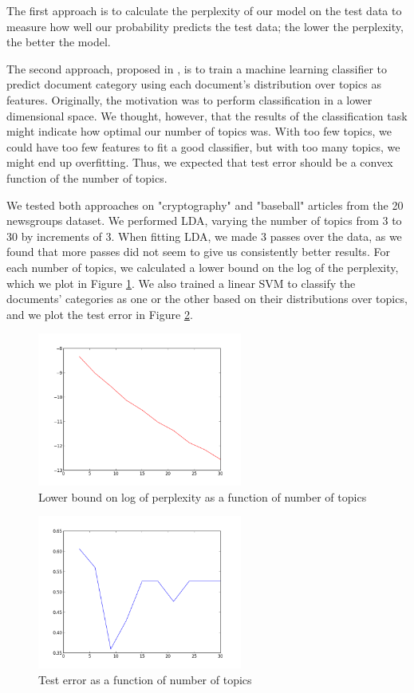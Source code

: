 \documentclass[10pt]{article}
\begin{document}
The first approach is to calculate the perplexity of our model on the test data to measure how well our probability predicts the test data; the lower the perplexity, the better the model.  

The second approach, proposed in \cite{lda}, is to train a machine learning classifier to predict document category using each document's distribution over topics as features.  Originally, the motivation was to perform classification in a lower dimensional space.  We thought, however, that the results of the classification task might indicate how optimal our number of topics was.  With too few topics, we could have too few features to fit a good classifier, but with too many topics, we might end up overfitting.  Thus, we expected that test error should be a convex function of the number of topics.  

We tested both approaches on "cryptography" and "baseball" articles from the 20 newsgroups dataset.  We performed LDA, varying the number of topics from 3 to 30 by increments of 3.  When fitting LDA, we made 3 passes over the data, as we found that more passes did not seem to give us consistently better results.  For each number of topics, we calculated a lower bound on the log of the perplexity, which we plot in Figure \ref{perplexity}.  We also trained a linear SVM to classify the documents' categories as one or the other based on their distributions over topics, and we plot the test error in Figure \ref{test-error}.

\begin{figure}[H]
\centering
\includegraphics[width=0.6\textwidth, keepaspectratio]{lda-logPerplexity}
\caption{Lower bound on log of perplexity as a function of number of topics}
\label{perplexity}
\end{figure}

\begin{figure}[H]
\centering
\includegraphics[width=0.6\textwidth, keepaspectratio]{lda-testError}
\caption{Test error as a function of number of topics}
\label{test-error}
\end{figure}
\end{document}
